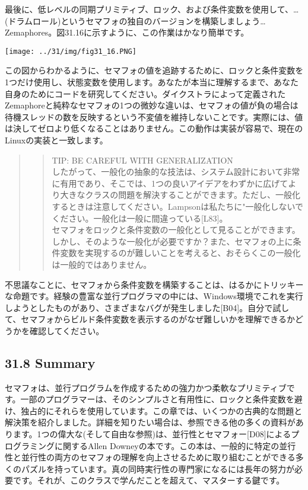 最後に、低レベルの同期プリミティブ、ロック、および条件変数を使用して、\ldots(ドラムロール)というセマフォの独自のバージョンを構築しましょう\ldots Zemaphores。図31.16に示すように、この作業はかなり簡単です。

\texttt{[image: ../31/img/fig31\_16.PNG]}

この図からわかるように、セマフォの値を追跡するために、ロックと条件変数を1つだけ使用し、状態変数を使用します。あなたが本当に理解するまで、あなた自身のためにコードを研究してください。ダイクストラによって定義されたZemaphoreと純粋なセマフォの1つの微妙な違いは、セマフォの値が負の場合は待機スレッドの数を反映するという不変値を維持しないことです。実際には、値は決してゼロより低くなることはありません。この動作は実装が容易で、現在のLinuxの実装と一致します。

\begin{quote}
\begin{quote}
TIP: BE CAREFUL WITH GENERALIZATION\\
したがって、一般化の抽象的な技法は、システム設計において非常に有用であり、そこでは、1つの良いアイデアをわずかに広げてより大きなクラスの問題を解決することができます。ただし、一般化するときは注意してください。Lampsonは私たちに"一般化しないでください。一般化は一般に間違っている{[}L83{]}。\\
セマフォをロックと条件変数の一般化として見ることができます。しかし、そのような一般化が必要ですか？また、セマフォの上に条件変数を実現するのが難しいことを考えると、おそらくこの一般化は一般的ではありません。
\end{quote}
\end{quote}

不思議なことに、セマフォから条件変数を構築することは、はるかにトリッキーな命題です。経験の豊富な並行プログラマの中には、Windows環境でこれを実行しようとしたものがあり、さまざまなバグが発生しました{[}B04{]}。自分で試して、セマフォからビルド条件変数を表示するのがなぜ難しいかを理解できるかどうかを確認してください。

\hypertarget{summary-20}{%
\subsection*{31.8 Summary}\label{summary-20}}

セマフォは、並行プログラムを作成するための強力かつ柔軟なプリミティブです。一部のプログラマーは、そのシンプルさと有用性に、ロックと条件変数を避け、独占的にそれらを使用しています。この章では、いくつかの古典的な問題と解決策を紹介しました。詳細を知りたい場合は、参照できる他の多くの資料があります。1つの偉大な(そして自由な参照)は、並行性とセマフォー{[}D08{]}によるプログラミングに関するAllen
Downeyの本です。この本は、一般的に特定の並行性と並行性の両方のセマフォの理解を向上させるために取り組むことができる多くのパズルを持っています。真の同時実行性の専門家になるには長年の努力が必要です。それが、このクラスで学んだことを超えて、マスターする鍵です。

